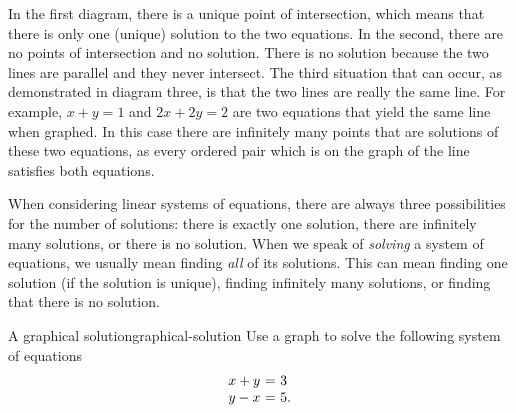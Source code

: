 In the first diagram, there is a unique point of
intersection, which means that there is only one (unique) solution to the two equations.
In the second, there are no points of intersection and  no solution. There is no solution because the two lines are parallel and they never intersect.
The third situation that can occur, as demonstrated in diagram three, is that the two lines are really the same line. For
example, $x+y=1$ and $2x+2y=2$ are two equations that yield the
same line when graphed. In this case there are infinitely many points that are
solutions of these two equations, as every ordered pair which is on the graph of
the line satisfies both equations.

When considering linear systems of equations, there are always three
possibilities for the number of solutions: there is exactly one
solution, there are infinitely many solutions, or there is no
solution.  When we speak of {\em solving} a system of equations, we
usually mean finding {\em all} of its solutions. This can mean finding
one solution (if the solution is unique), finding infinitely many
solutions, or finding that there is no solution.

\begin{example}{A graphical solution}{graphical-solution}
  Use a graph to solve the following system of equations \:
  \begin{equation*}
    \begin{array}{r@{~}c@{~}l}
      x+y&=&3 \\
      y-x&=&5.
    \end{array}
  \end{equation*}
\end{example}

